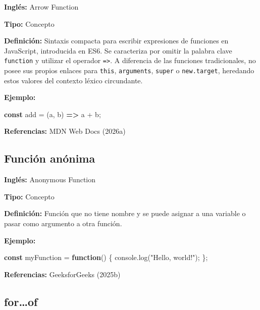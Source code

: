 \documentclass[
  letterpaper,
  DIV=11,
  numbers=noendperiod]{scrreprt}
\newenvironment{Shaded}{\begin{snugshade}}{\end{snugshade}}
\newcommand{\BuiltInTok}[1]{\textcolor[rgb]{0.00,0.23,0.31}{#1}}
\newcommand{\FunctionTok}[1]{\textcolor[rgb]{0.28,0.35,0.67}{#1}}
\newcommand{\KeywordTok}[1]{\textcolor[rgb]{0.00,0.23,0.31}{\textbf{#1}}}
\newcommand{\NormalTok}[1]{\textcolor[rgb]{0.00,0.23,0.31}{#1}}
\newcommand{\OperatorTok}[1]{\textcolor[rgb]{0.37,0.37,0.37}{#1}}
\newcommand{\StringTok}[1]{\textcolor[rgb]{0.13,0.47,0.30}{#1}}
\let\oldsubsection\subsection
\renewcommand{\subsection}{\phantomsection\oldsubsection}
\begin{document}
\textbf{Inglés:} Arrow Function

\textbf{Tipo:} Concepto

\textbf{Definición:} Sintaxis compacta para escribir expresiones de
funciones en JavaScript, introducida en ES6. Se caracteriza por omitir
la palabra clave \texttt{function} y utilizar el operador
\texttt{=\textgreater{}}. A diferencia de las funciones tradicionales,
no posee sus propios enlaces para \texttt{this}, \texttt{arguments},
\texttt{super} o \texttt{new.target}, heredando estos valores del
contexto léxico circundante.

\textbf{Ejemplo:}

\begin{Shaded}
\begin{Highlighting}[]
\KeywordTok{const}\NormalTok{ add }\OperatorTok{=}\NormalTok{ (a}\OperatorTok{,}\NormalTok{ b) }\KeywordTok{=\textgreater{}}\NormalTok{ a }\OperatorTok{+}\NormalTok{ b}\OperatorTok{;}
\end{Highlighting}
\end{Shaded}

\textbf{Referencias:} MDN Web Docs (2026a)

\subsection*{Función anónima}\label{glos-funcion_anonima}

\textbf{Inglés:} Anonymous Function

\textbf{Tipo:} Concepto

\textbf{Definición:} Función que no tiene nombre y se puede asignar a
una variable o pasar como argumento a otra función.

\textbf{Ejemplo:}

\begin{Shaded}
\begin{Highlighting}[]
\KeywordTok{const}\NormalTok{ myFunction }\OperatorTok{=} \KeywordTok{function}\NormalTok{() \{}
    \BuiltInTok{console}\OperatorTok{.}\FunctionTok{log}\NormalTok{(}\StringTok{"Hello, world!"}\NormalTok{)}\OperatorTok{;}
\NormalTok{\}}\OperatorTok{;}
\end{Highlighting}
\end{Shaded}

\textbf{Referencias:} GeeksforGeeks (2025b)

\subsection*{for\ldots of}\label{glos-for_of}
\end{document}
